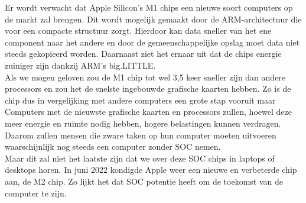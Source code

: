 \documentclass{hogent-article}
\begin{document}
Er wordt verwacht dat Apple Silicon's M1 chips een nieuwe soort computers op de markt zal brengen. Dit wordt mogelijk gemaakt door de ARM-architectuur die voor een compacte structuur zorgt. Hierdoor kan data sneller van het ene component naar het andere en door de gemeenschappelijke opslag moet data niet steeds gekopieerd worden. Daarnaast ziet het ernaar uit dat de chips energie zuiniger zijn dankzij ARM's big.LITTLE. \\
Als we \textcite{Apple2020} mogen geloven zou de M1 chip tot wel 3,5 keer sneller zijn dan andere processors en zou het de snelste ingebouwde grafische kaarten hebben. Zo is de chip dus in vergelijking met andere computers een grote stap vooruit maar Computers met de nieuwste grafische kaarten en processors zullen, hoewel deze meer energie en ruimte nodig hebben, hogere belastingen kunnen verdragen. Daarom zullen mensen die zware taken op hun computer moeten uitvoeren waarschijnlijk nog steeds een computer zonder SOC nemen. \\
Maar dit zal niet het laatste zijn dat we over deze SOC chips in laptops of desktops horen. In juni 2022 kondigde Apple weer een nieuwe en verbeterde chip aan, de M2 chip. Zo lijkt het dat SOC potentie heeft om de toekomst van de computer te zijn.


\printbibliography[heading=bibintoc]
\end{document}

